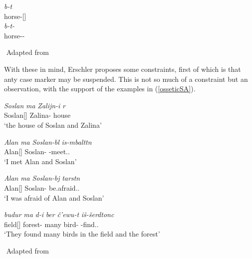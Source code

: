 \begin{exe}
    \ex \label{osseticdeletion}
    \begin{xlist}
        \ex \gll
        \textit{b\textturna\textchi-t\textturna} \\ horse-{\Pl}[{\Nom}] \\
        
        \ex \gll 
        \textit{b\textturna\textchi-t-\textschwa} \\ horse-{\Pl}-{\Obl} \\
    \end{xlist}
    ${}$ \hfill Adapted from \cite{erschler2012suspended}
\end{exe}

With these in mind, Erschler proposes some constraints, first of which is that anty case marker may be suspended. This is not so much of a constraint but an observation, with the support of the examples in (\ref{osseticSA}).

\begin{exe}
    \ex \label{osseticSA}
    \begin{xlist}
        \ex \gll 
        \textit{Soslan} \textit{\textturna ma} \textit{Zalijn-i} \textit{\textchi\textturna\textdzlig r\textturna} \\ Soslan[{\Nom}] {\And} Zalina-{\Obl} house \\
        \glt `the house of Soslan and Zalina'
        
        \ex \gll 
        \textit{Alan} \textit{\textturna ma} \textit{Soslan-b\textturna l} \textit{is-\textturna mbaltt\textturna n} \\ Alan[{\Nom}] {\And} Soslan-{\Sup} {\Prv}-meet.{\Pst}.{\First}{\Sg} \\
        \glt `I met Alan and Soslan'
        
        \ex \gll 
        \textit{Alan} \textit{\textturna ma} \textit{Soslan-b\textturna j} \textit{tarst\textturna n} \\ Alan[{\Nom}] {\And} Soslan-{\Abl} be.afraid.{\Pst}.{\First}{\Sg} \\
        \glt `I was afraid of Alan and Soslan'
        
        \ex \gll 
        \textit{budur} \textit{\textturna ma} \textit{\textinvscr\textturna d-i} \textit{ber\textturna} \textit{\v{c}'ewu-t\textturna} \textit{i\v{s}-\v{s}erdtonc\textturna} \\ field[{\Nom}] {\And} forest-{\Loc} many bird-{\Pl} {\Prv}-find.{\Pst}.{\Third}{\Pl} \\
        \glt `They found many birds in the field and the forest'
    \end{xlist}
    ${}$ \hfill Adapted from \cite{erschler2012suspended}
\end{exe}

